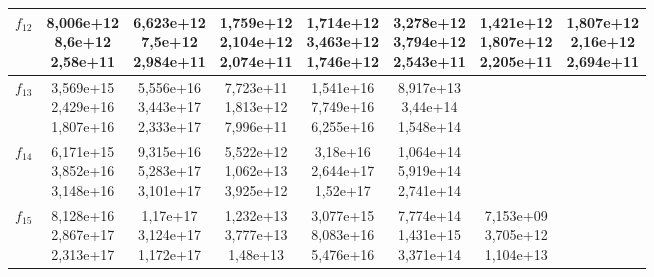 \begin{table}[t]
\begin{small}
\begin{tabular}{|c|c|c|c|c|c|c|c|}
        $f_{12}$ & \makecell{8,006e+12 \\ 8,6e+12 \\ 2,58e+11}    & \makecell{6,623e+12 \\ 7,5e+12 \\ 2,984e+11}   & \makecell{1,759e+12 \\ 2,104e+12 \\ 2,074e+11} & \makecell{1,714e+12 \\ 3,463e+12 \\ 1,746e+12} & \makecell{3,278e+12 \\ 3,794e+12 \\ 2,543e+11} & \makecell{\textbf{1,421e+12} \\ \textbf{1,807e+12} \\ 2,205e+11} & \makecell{1,807e+12 \\ 2,16e+12 \\ 2,694e+11} \\\hline
        $f_{13}$ & \makecell{3,569e+15 \\ 2,429e+16 \\ 1,807e+16} & \makecell{5,556e+16 \\ 3,443e+17 \\ 2,333e+17} & \makecell{7,723e+11 \\ 1,813e+12 \\ 7,996e+11} & \makecell{1,541e+16 \\ 7,749e+16 \\ 6,255e+16} & \makecell{8,917e+13 \\ 3,44e+14 \\ 1,548e+14}  & & \\\hline
        $f_{14}$ & \makecell{6,171e+15 \\ 3,852e+16 \\ 3,148e+16} & \makecell{9,315e+16 \\ 5,283e+17 \\ 3,101e+17} & \makecell{5,522e+12 \\ 1,062e+13 \\ 3,925e+12} & \makecell{3,18e+16 \\ 2,644e+17 \\ 1,52e+17}  & \makecell{1,064e+14 \\ 5,919e+14 \\ 2,741e+14} & & \\\hline
        $f_{15}$ & \makecell{8,128e+16 \\ 2,867e+17 \\ 2,313e+17} & \makecell{1,17e+17 \\ 3,124e+17 \\ 1,172e+17}  & \makecell{1,232e+13 \\ 3,777e+13 \\ 1,48e+13}  & \makecell{3,077e+15 \\ 8,083e+16 \\ 5,476e+16} & \makecell{7,774e+14 \\ 1,431e+15 \\ 3,371e+14} & \makecell{7,153e+09 \\ 3,705e+12 \\ 1,104e+13} & \\\hline

\end{tabular}
\end{small}
\end{table}
